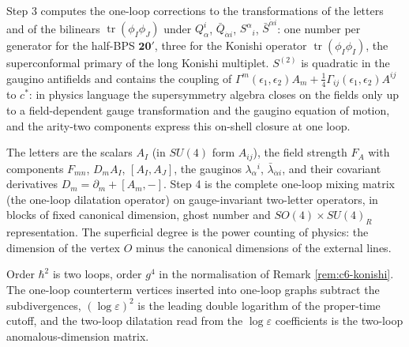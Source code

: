 \begin{remark}
Step 3 computes the one-loop corrections to the transformations of the letters and of the bilinears $\operatorname{tr}(\phi_I\phi_J)$ under $Q^i_\alpha$, $\bar Q_{\dot\alpha i}$, $S^\alpha{}_i$, $\bar S^{\dot\alpha i}$: one number per generator for the half-BPS $\mathbf{20'}$, three for the Konishi operator $\operatorname{tr}(\phi_I\phi_I)$, the superconformal primary of the long Konishi multiplet. $S^{(2)}$ is quadratic in the gaugino antifields and contains the coupling of $\Gamma^m(\epsilon_1,\epsilon_2)A_m+\tfrac14\Gamma_{ij}(\epsilon_1,\epsilon_2)A^{ij}$ to $c^*$: in physics language the supersymmetry algebra closes on the fields only up to a field-dependent gauge transformation and the gaugino equation of motion, and the arity-two components express this on-shell closure at one loop.
\end{remark}

\begin{remark}
The letters are the scalars $A_I$ (in $SU(4)$ form $A_{ij}$), the field strength $F_A$ with components $F_{mn}$, $D_mA_I$, $[A_I,A_J]$, the gauginos $\lambda_\alpha{}^i$, $\bar\lambda_{\dot\alpha i}$, and their covariant derivatives $D_m=\partial_m+[A_m,-]$. Step 4 is the complete one-loop mixing matrix (the one-loop dilatation operator) on gauge-invariant two-letter operators, in blocks of fixed canonical dimension, ghost number and $SO(4)\times SU(4)_R$ representation. The superficial degree is the power counting of physics: the dimension of the vertex $O$ minus the canonical dimensions of the external lines.
\end{remark}

\begin{remark}
Order $\hbar^2$ is two loops, order $g^4$ in the normalisation of Remark \ref{rem:c6-konishi}. The one-loop counterterm vertices inserted into one-loop graphs subtract the subdivergences, $(\log\varepsilon)^2$ is the leading double logarithm of the proper-time cutoff, and the two-loop dilatation read from the $\log\varepsilon$ coefficients is the two-loop anomalous-dimension matrix.
\end{remark}
